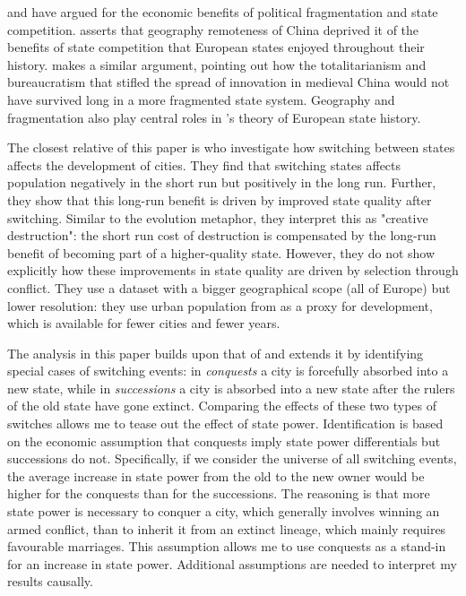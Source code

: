 \documentclass[11pt, a4paper]{article}
\begin{document}
\cite{diamond1997} and \cite{landes1969, landes2006} have argued for the economic benefits of political fragmentation and state competition. \cite{diamond1997} asserts that geography 
remoteness of China deprived it of the benefits of state competition that European states enjoyed throughout their history. \cite{landes2006} makes a similar argument, pointing out how the totalitarianism and bureaucratism that stifled the spread of innovation in medieval China would not have survived long in a more fragmented state system. Geography and fragmentation also play central roles in \cite{cervellati2022}'s theory of European state history.

The closest relative of this paper is \cite{schoenholzer2022} who investigate how switching between states affects the development of cities. They find that switching states affects population negatively in the short run but positively in the long run. Further, they show that this long-run benefit is driven by improved state quality after switching. Similar to the evolution metaphor, they interpret this as "creative destruction": the short run cost of destruction is compensated by the long-run benefit of becoming part of a higher-quality state. However, they do not show explicitly how these improvements in state quality are driven by selection through conflict. They use a dataset with a bigger geographical scope (all of Europe) but lower resolution: they use urban population from \cite{bairoch1988} as a proxy for development, which is available for fewer cities and fewer years.

The analysis in this paper builds upon that of \cite{schoenholzer2022} and extends it by identifying special cases of switching events: in \textit{conquests} a city is forcefully absorbed into a new state, while in \textit{successions} a city is absorbed into a new state after the rulers of the old state have gone extinct. Comparing the effects of these two types of switches allows me to tease out the effect of state power. Identification is based on the economic assumption that conquests imply state power differentials but successions do not. Specifically, if we consider the universe of all switching events, the average increase in state power from the old to the new owner would be higher for the conquests than for the successions. The reasoning is that more state power is necessary to conquer a city, which generally involves winning an armed conflict, than to inherit it from an extinct lineage, which mainly requires favourable marriages. This assumption allows me to use conquests as a stand-in for an increase in state power. Additional assumptions are needed to interpret my results causally.
\end{document}
